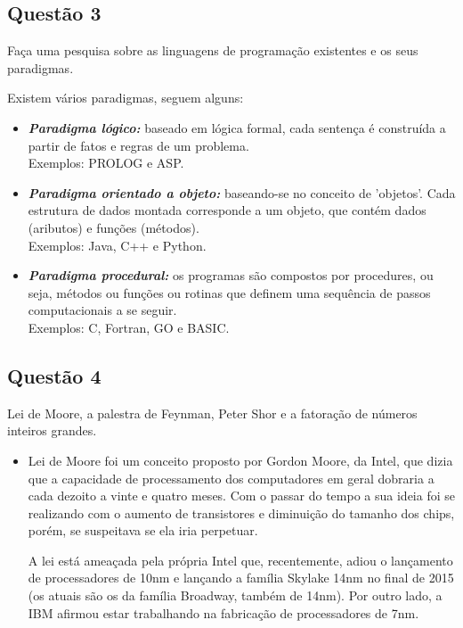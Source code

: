 \documentclass{article}
\begin{document}
\subsection*{Questão 3}
Faça uma pesquisa sobre as linguagens de programação existentes e os seus paradigmas. \par
        Existem vários paradigmas, seguem alguns:
        \begin{itemize}
        \item \textit{\textbf{Paradigma lógico:}} baseado em lógica formal, cada sentença é construída a partir de fatos e regras de um problema. \\
        Exemplos: PROLOG e ASP.
        \end{itemize}
        
        \begin{itemize}
        \item \textit{\textbf{Paradigma orientado a objeto:}} baseando-se no conceito de 'objetos'. Cada estrutura de dados montada corresponde a um objeto, que contém dados (aributos) e funções (métodos). \\
        Exemplos: Java, C++ e Python.
        \end{itemize}
        
        \begin{itemize}
        \item \textit{\textbf{Paradigma procedural:}} os programas são compostos por procedures, ou seja, métodos ou funções ou rotinas que definem uma sequência de passos computacionais a se seguir. \\
        Exemplos: C, Fortran, GO e BASIC.
        \end{itemize}

\subsection*{Questão 4}
Lei de Moore, a palestra de Feynman, Peter Shor e a fatoração de números inteiros grandes.
        \begin{itemize}
        \item Lei de Moore foi um conceito proposto por Gordon Moore, da Intel, que dizia que a capacidade de processamento dos computadores em geral dobraria a cada dezoito a vinte e quatro meses. Com o passar do tempo a sua ideia foi se realizando com o aumento de transistores e diminuição do tamanho dos chips, porém, se suspeitava se ela iria perpetuar. \par

A lei está ameaçada pela própria Intel que, recentemente, adiou o lançamento de processadores de 10nm e lançando a família Skylake 14nm no final de 2015 (os atuais são os da família Broadway, também de 14nm). Por outro lado, a IBM afirmou estar trabalhando na fabricação de processadores de 7nm.
        \end{itemize}
        
\end{document}
